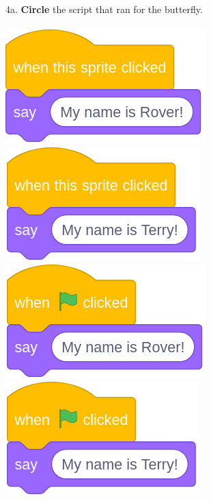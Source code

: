 \documentclass[letterpaper,12pt]{article}
\begin{document}
\noindent 4a. \textbf{Circle} the script that ran for the butterfly. \\ \\
\includegraphics[scale=.3,valign=t]{q4_script0.png} \hspace{1cm}
\includegraphics[scale=.3,valign=t]{q4_script1.png} \hspace{1cm}
\includegraphics[scale=.3,valign=t]{q4_script2.png} \hspace{1cm}
\includegraphics[scale=.3,valign=t]{q4_script3.png} \hspace{1cm}
\vspace{1cm}
\end{document}
